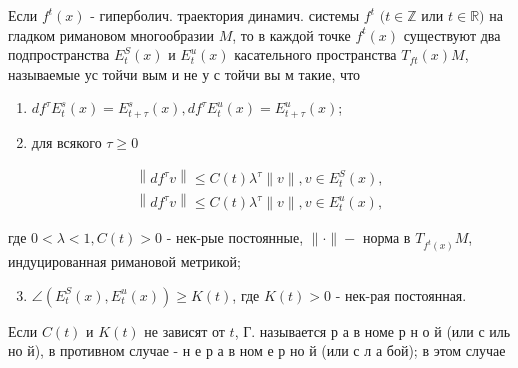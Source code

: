 \documentclass[10pt]{article}
\begin{document}
Если $f^{t}(x)$ - гиперболич. траектория динамич. системы $f^{t}$ $(t \in \mathbb{Z}$ или $t \in \mathbb{R})$ на гладком римановом многообразии $M$, то в каждой точке $f^{t}(x)$ существуют два подпространства $E_{t}^{S}(x)$ и $E_{t}^{u}(x)$ касательного пространства $T_{f t}(x) M$, называемые ус тойчи вым и не у с тойчи вы м такие, что



\begin{enumerate}

  \item $d f^{\tau} E_{t}^{s}(x)=E_{t+\tau}^{s}(x), d f^{\tau} E_{t}^{u}(x)=E_{t+\tau}^{u}(x)$;



  \item для всякого $\tau \geqslant 0$



\end{enumerate}



\[

\begin{gathered}

\left\|d f^{\tau} v\right\| \leqslant C(t) \lambda^{\tau}\|v\|, v \in E_{t}^{S}(x), \\

\left\|d f^{\tau} v\right\| \leqslant C(t) \lambda^{\tau}\|v\|, v \in E_{t}^{u}(x),

\end{gathered}

\]



где $0<\lambda<1, C(t)>0$ - нек-рые постоянные, $\|\cdot\|-$ норма в $T_{f^{t}(x)} M$, индуцированная римановой метрикой;



\begin{enumerate}

  \setcounter{enumi}{2}

  \item $\angle\left(E_{t}^{S}(x), E_{t}^{u}(x)\right) \geqslant K(t)$, где $K(t)>0$ - нек-рая постоянная.

\end{enumerate}



Если $C(t)$ и $K(t)$ не зависят от $t$, Г. называется р а в номе р н о й (или с иль но й), в противном случае - н е р а в ном е р но й (или с л а бой); в этом случае
\end{document}
